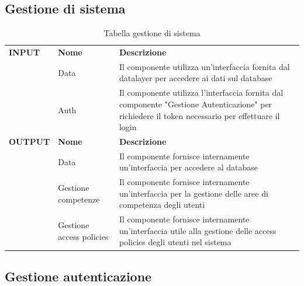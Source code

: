 \documentclass{article}
\begin{document}
\clearpage

\subsection{Gestione di sistema}

\begin{table}[htbp]
    \centering
    \renewcommand{\arraystretch}{1.3} %
    \begin{tabularx}{\textwidth}{| l | l | X |}
        \Xhline{2pt}
        \textbf{INPUT} & \textbf{Nome} & \textbf{Descrizione} \\
        \Xhline{2pt}
         & Data & Il componente utilizza un’interfaccia fornita dal datalayer per accedere ai dati sul database \\
        \hline
         & Auth & Il componente utilizza l'interfaccia fornita dal componente "Gestione Autenticazione" per richiedere il token necessario per effettuare il login \\
         \Xhline{2pt}
        \textbf{OUTPUT} & \textbf{Nome} & \textbf{Descrizione} \\
        \Xhline{2pt}
         & Data & Il componente fornisce internamente un’interfaccia per accedere al database \\
        \hline
         & Gestione competenze & Il componente fornisce internamente un'interfaccia per la gestione delle aree di competenza degli utenti \\
        \hline
         & Gestione access policies & Il componente fornisce internamente un'interfaccia utile alla gestione delle access policies degli utenti nel sistema \\
        \hline
        \end{tabularx}
    \caption{Tabella gestione di sistema}
\end{table}

\subsection{Gestione autenticazione}
\end{document}
